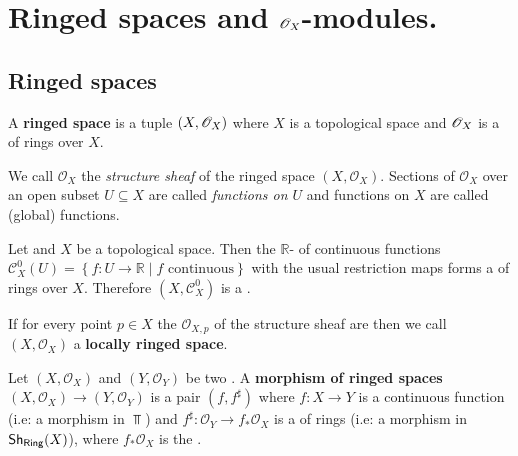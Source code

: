 \documentclass[../main.tex]{subfiles}
\begin{document}
\chapter{Ringed spaces and \(\mathscr{O}_{X}\)-modules.}
\section{Ringed spaces}

\begin{definition} \label{def:ringed-space}
  A \textbf{ringed space} is a tuple \((X, \mathscr{O}_{X})\) where \(X\) is a topological space and \(\mathscr{O}_{X}\) is a  of rings over \(X\).

  We call \(\mathscr{O}_{X}\) the \textit{structure sheaf} of the ringed space \((X, \mathscr{O}_{X})\).
  Sections of \(\mathscr{O}_{X}\) over an open subset \(U \subseteq X\) are called \textit{functions on \(U\)} and functions on \(X\) are called (global) functions.
\end{definition}

\begin{example}
  Let and \(X\) be a topological space.
  Then the \(\mathbb{R}\)- of continuous functions \(\mathcal{C}_{X}^{0}(U) = \left\{ f: U \to \mathbb{R} \mid f \text{ continuous} \right\}\) with the usual restriction maps forms a  of rings over \(X\).
  Therefore \((X, \mathcal{C}_{X}^{0})\) is a .
\end{example}

\begin{example}
  If for every point \(p \in X\) the  \(\mathscr{O}_{X, p}\) of the structure sheaf are  then we call \((X, \mathscr{O}_{X})\) a \textbf{locally ringed space}.
\end{example}


\begin{definition} \label{def:ringed-spaces-morphism}
  Let \((X, \mathscr{O}_{X})\) and \((Y, \mathscr{O}_{Y})\) be two .
  A \textbf{morphism of ringed spaces} \((X, \mathscr{O}_{X}) \to (Y, \mathscr{O}_{Y})\) is a pair \((f, f^{\sharp})\) where \(f: X \to Y\) is a continuous function (i.e: a morphism in \(\Top\)) and \(f^{\sharp}: \mathscr{O}_{Y} \to f_{\ast}\mathscr{O}_{X}\) is a  of rings (i.e: a morphism in \(\mathsf{Sh}_{\mathsf{Ring}}(X)\)), where \(f_{\ast}\mathscr{O}_{X}\) is the .
\end{definition}
\end{document}

